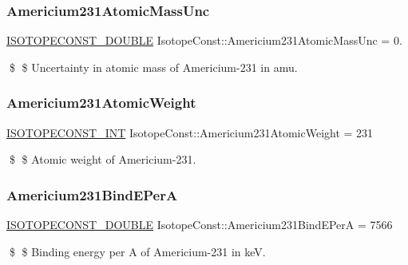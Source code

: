 \subsubsection{\texorpdfstring{Americium231\+Atomic\+Mass\+Unc}{Americium231AtomicMassUnc}}
{\footnotesize\ttfamily \mbox{\hyperlink{group___isotope_const-_macros_ga8f45a7272ce02c0b4c65c44636ed719a}{I\+S\+O\+T\+O\+P\+E\+C\+O\+N\+S\+T\+\_\+\+D\+O\+U\+B\+LE}} Isotope\+Const\+::\+Americium231\+Atomic\+Mass\+Unc = 0.}

\$ \$ Uncertainty in atomic mass of Americium-\/231 in amu. \mbox{\label{group___isotope_const-_americium-_am231_ga481dd87b0a910696373e7e2faeb8caf4}} 
\subsubsection{\texorpdfstring{Americium231\+Atomic\+Weight}{Americium231AtomicWeight}}
{\footnotesize\ttfamily \mbox{\hyperlink{group___isotope_const-_macros_ga5f18360b3e99483a35c32d789e62621c}{I\+S\+O\+T\+O\+P\+E\+C\+O\+N\+S\+T\+\_\+\+I\+NT}} Isotope\+Const\+::\+Americium231\+Atomic\+Weight = 231}

\$ \$ Atomic weight of Americium-\/231. \mbox{\label{group___isotope_const-_americium-_am231_ga1182dd0b637b165df45fbe90af9ce3c0}} 
\subsubsection{\texorpdfstring{Americium231\+Bind\+E\+PerA}{Americium231BindEPerA}}
{\footnotesize\ttfamily \mbox{\hyperlink{group___isotope_const-_macros_ga8f45a7272ce02c0b4c65c44636ed719a}{I\+S\+O\+T\+O\+P\+E\+C\+O\+N\+S\+T\+\_\+\+D\+O\+U\+B\+LE}} Isotope\+Const\+::\+Americium231\+Bind\+E\+PerA = 7566}

\$ \$ Binding energy per A of Americium-\/231 in keV. \mbox{\label{group___isotope_const-_americium-_am231_ga38c3b95063652729b2b9a56885812735}} 
